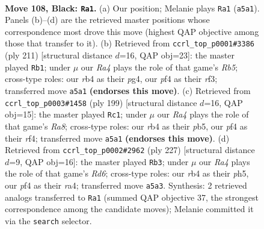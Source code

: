 \documentclass[11pt]{article}
\begin{document}
\clearpage

\begin{figure}[p]\centering
\begin{subfigure}{0.46\textwidth}\centering
\resizebox{\linewidth}{!}{%
\newchessgame
\chessboard[
  setfen={8/3k4/4p3/r3P3/1R3PR1/8/5K2/8 b - - 2 108},
  showmover=false,
  pgfstyle=straightmove, color=movearrow, markmove={a5-a1}
]}
\caption{}
\end{subfigure}\hfill
\begin{subfigure}{0.46\textwidth}\centering
\resizebox{\linewidth}{!}{%
\newchessgame
\chessboard[
  setfen={8/8/6kp/8/1r3PPK/5R2/8/8 b - - 6 106},
  showmover=false,
  pgfstyle=straightmove, color=movearrow, markmove={b4-b1}
]}
\caption{}
\end{subfigure}
\\[4pt]
\begin{subfigure}{0.46\textwidth}\centering
\resizebox{\linewidth}{!}{%
\newchessgame
\chessboard[
  setfen={8/1k6/8/pP3K2/P4R2/8/8/r7 b - - 98 100},
  showmover=false,
  pgfstyle=straightmove, color=movearrow, markmove={a1-c1}
]}
\caption{}
\end{subfigure}\hfill
\begin{subfigure}{0.46\textwidth}\centering
\resizebox{\linewidth}{!}{%
\newchessgame
\chessboard[
  setfen={6k1/5p2/7p/7P/R3P3/P2r4/6K1/8 b - - 0 114},
  showmover=false,
  pgfstyle=straightmove, color=movearrow, markmove={d3-b3}
]}
\caption{}
\end{subfigure}
\caption{\textbf{Move 108, Black: \texttt{Ra1}.} (a) Our position; Melanie plays \texttt{Ra1} (\texttt{a5a1}). Panels (b)--(d) are the retrieved master positions whose correspondence most drove this move (highest QAP objective among those that transfer to it). (b) Retrieved from \texttt{ccrl\_top\_p0001\#3386} (ply 211) [structural distance $d$=16, QAP obj=23]: the master played \texttt{Rb1}; under $\mu$ our \emph{Ra4} plays the role of that game's \emph{Rb5}; cross-type roles: our \emph{r}b4 as their \emph{p}g4, our \emph{p}f4 as their \emph{r}f3; transferred move \texttt{a5a1} \textbf{(endorses this move)}. (c) Retrieved from \texttt{ccrl\_top\_p0003\#1458} (ply 199) [structural distance $d$=16, QAP obj=15]: the master played \texttt{Rc1}; under $\mu$ our \emph{Ra4} plays the role of that game's \emph{Ra8}; cross-type roles: our \emph{r}b4 as their \emph{p}b5, our \emph{p}f4 as their \emph{r}f4; transferred move \texttt{a5a1} \textbf{(endorses this move)}. (d) Retrieved from \texttt{ccrl\_top\_p0002\#2962} (ply 227) [structural distance $d$=9, QAP obj=16]: the master played \texttt{Rb3}; under $\mu$ our \emph{Ra4} plays the role of that game's \emph{Rd6}; cross-type roles: our \emph{r}b4 as their \emph{p}h5, our \emph{p}f4 as their \emph{r}a4; transferred move \texttt{a5a3}. Synthesis: 2 retrieved analogs transferred to \texttt{Ra1} (summed QAP objective 37, the strongest correspondence among the candidate moves); Melanie committed it via the \texttt{search} selector.}
\label{fig:thought-m215}
\end{figure}
\end{document}
